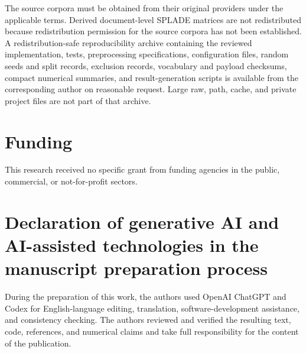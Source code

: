 \documentclass[preprint,12pt,authoryear]{elsarticle}
\begin{document}
The source corpora must be obtained from their original providers under the
applicable terms. Derived document-level SPLADE matrices are not redistributed
because redistribution permission for the source corpora has not been
established. A redistribution-safe reproducibility archive containing the
reviewed implementation, tests, preprocessing specifications, configuration
files, random seeds and split records, exclusion records, vocabulary and
payload checksums, compact numerical summaries, and result-generation scripts
is available from the corresponding author on reasonable request. Large raw,
path, cache, and private project files are not part of that archive.

\section*{Funding}

This research received no specific grant from funding agencies in the public,
commercial, or not-for-profit sectors.

\section*{Declaration of generative AI and AI-assisted technologies in the manuscript preparation process}

During the preparation of this work, the authors used OpenAI ChatGPT and Codex
for English-language editing, translation, software-development assistance,
and consistency checking. The authors reviewed and verified the resulting
text, code, references, and numerical claims and take full responsibility for
the content of the publication.



\end{document}
